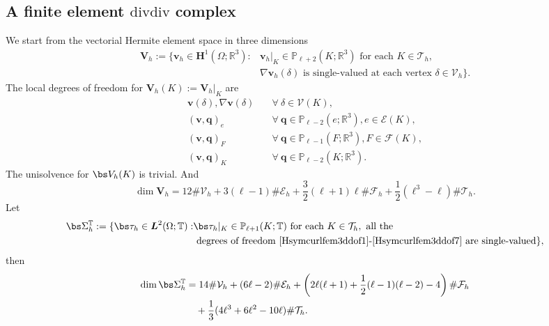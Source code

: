 \subsection{A finite element $\textrm{divdiv}$ complex}
We start from the vectorial Hermite element space in three dimensions \cite{Ciarlet1978}
\begin{align*}
\boldsymbol V_h:=\{\boldsymbol v_h\in \boldsymbol H^1(\Omega;\mathbb R^3): &\boldsymbol v_h|_K\in\mathbb P_{\ell+2}(K;\mathbb R^3)\textrm{ for each } K\in\mathcal T_h,\\
&\nabla \boldsymbol v_h(\delta) \textrm{ is single-valued at each vertex } \delta\in\mathcal V_h  
\}.
\end{align*}
The local degrees of freedom for $\boldsymbol V_h(K):=\boldsymbol V_h|_K$ are
\begin{align}
\boldsymbol v(\delta), \nabla \boldsymbol v(\delta) & \quad\forall~\delta\in \mathcal V(K), \label{Hermitfem3ddof1}\\
(\boldsymbol v, \boldsymbol q)_e & \quad\forall~\boldsymbol q\in\mathbb P_{\ell-2}(e;\mathbb R^3),  e\in\mathcal E(K), \label{Hermitfem3ddof2}\\
(\boldsymbol v, \boldsymbol q)_F & \quad\forall~\boldsymbol q\in\mathbb P_{\ell-1}(F;\mathbb R^3),  F\in\mathcal F(K),\label{Hermitfem3ddof3}\\
(\boldsymbol v, \boldsymbol q)_K & \quad\forall~\boldsymbol q\in\mathbb P_{\ell-2}(K;\mathbb R^3). \label{Hermitfem3ddof4} 
\end{align}
The unisolvence for $\bs V_h(K)$ is trivial. 
And
$$
\dim\boldsymbol V_h= 12\#\mathcal V_h+ 3(\ell-1)\#\mathcal E_h + \frac{3}{2}(\ell+1)\ell\#\mathcal F_h +\frac{1}{2}(\ell^3-\ell)\#\mathcal T_h.
$$
%
Let
\begin{align*}
\bs\Sigma_h^{\mathbb T}:=\{\bs\tau_h\in \boldsymbol L^2(\Omega; \mathbb T): &\bs\tau_h|_K\in\mathbb P_{\ell+1}(K;\mathbb T) \textrm{ for each } K\in\mathcal T_h, \textrm{ all the } \\
& \textrm{ degrees of freedom~\eqref{Hsymcurlfem3ddof1}-\eqref{Hsymcurlfem3ddof7} are single-valued} \},
\end{align*}
then
\begin{align*}
\dim\bs\Sigma_h^{\mathbb T}&= 14\#\mathcal V_h+ (6\ell-2)\#\mathcal E_h + \left(2\ell(\ell+1) + \frac{1}{2}(\ell-1)(\ell-2)-4\right)\#\mathcal F_h \\
&\quad+ \frac{1}{3}(4\ell^3+6\ell^2-10\ell) \#\mathcal T_h.
\end{align*}
